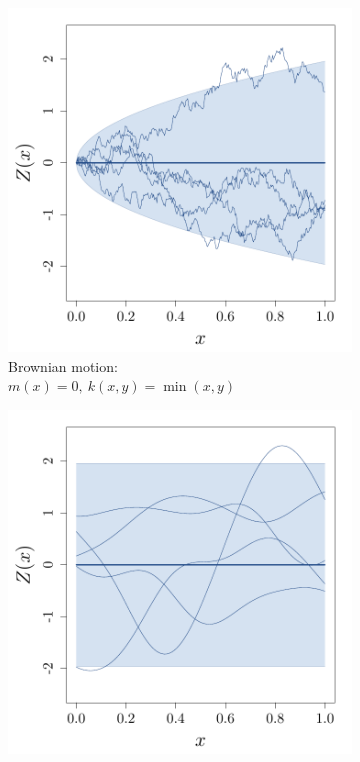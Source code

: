 \documentclass[twoside,openright]{report}
\begin{document}
\begin{figure}
        \centering
        \begin{subfigure}[t]{0.34\textwidth}
                \includegraphics[width=\textwidth]{figures/ch1_GPpath0}
                \caption{Brownian motion: \\$m(x) = 0,\ k(x,y)= \min(x,y)$}
        \end{subfigure}%
        \hspace{1cm}       
        \begin{subfigure}[t]{0.34\textwidth}
                \includegraphics[width=\textwidth]{figures/ch1_GPpath2}

\end{subfigure}
\end{figure}
\end{document}
